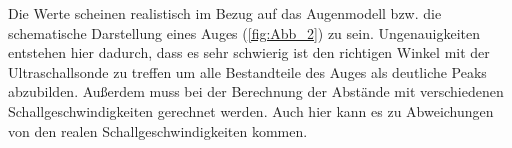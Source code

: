 Die Werte scheinen realistisch im Bezug auf das Augenmodell bzw. die schematische Darstellung eines Auges (\autoref{fig:Abb_2}) zu sein.
Ungenauigkeiten entstehen hier dadurch, dass es sehr schwierig ist den richtigen Winkel mit der Ultraschallsonde zu treffen um alle 
Bestandteile des Auges als deutliche Peaks abzubilden. Außerdem muss bei der Berechnung der Abstände mit verschiedenen Schallgeschwindigkeiten
gerechnet werden. Auch hier kann es zu Abweichungen von den realen Schallgeschwindigkeiten kommen.

